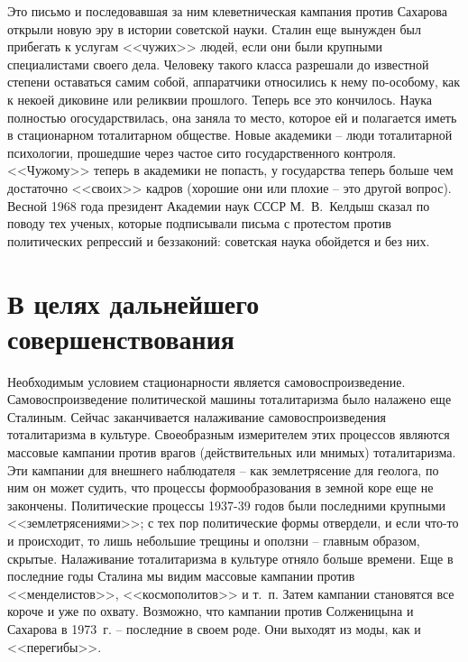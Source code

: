 \documentclass{book}
\begin{document}
Это письмо и последовавшая за ним клеветническая кампания против Сахарова открыли новую эру в истории советской науки. Сталин еще вынужден был прибегать к услугам <<чужих>> людей, если они были крупными специалистами своего дела. Человеку такого класса разрешали до известной степени оставаться самим собой, аппаратчики относились к нему по-особому, как к некоей диковине или реликвии прошлого. Теперь все это кончилось. Наука полностью огосударствилась, она заняла то место, которое ей и полагается иметь в стационарном тоталитарном обществе. Новые академики -- люди тоталитарной психологии, прошедшие через частое сито государственного контроля. <<Чужому>> теперь в академики не попасть, у государства теперь больше чем достаточно <<своих>> кадров (хорошие они или плохие -- это другой вопрос). Весной 1968 года президент Академии наук СССР М.~В.~Келдыш сказал по поводу тех ученых, которые подписывали письма с протестом против политических репрессий и беззаконий: советская наука обойдется и без них.



\section{В целях дальнейшего совершенствования}

Необходимым условием стационарности является самовоспроизведение. Самовоспроизведение политической машины тоталитаризма было 
налажено еще Сталиным. Сейчас заканчивается налаживание самовоспроизведения тоталитаризма в культуре. Своеобразным измерителем 
этих процессов являются массовые кампании  против врагов (действительных или мнимых) тоталитаризма. Эти кампании для внешнего 
наблюдателя -- как землетрясение для геолога, по ним он может судить, что процессы формообразования в земной коре еще не 
закончены. Политические процессы 1937-39 годов были последними крупными <<землетрясениями>>; с тех пор полити­ческие формы 
отвердели, и если что-то и происходит, то лишь небольшие трещины и оползни -- главным образом, скрытые. Налаживание 
тоталитаризма в культуре отняло больше времени. Еще в последние годы Сталина мы видим массовые кампании против <<менделистов>>, 
<<космополитов>> и т.~п. Затем кампании становятся все короче и уже по охвату. Возможно, что кампании против Солженицына и 
Сахарова в 1973~г. -- последние в своем роде. Они выходят из моды, как и <<перегибы>>.
\end{document}
